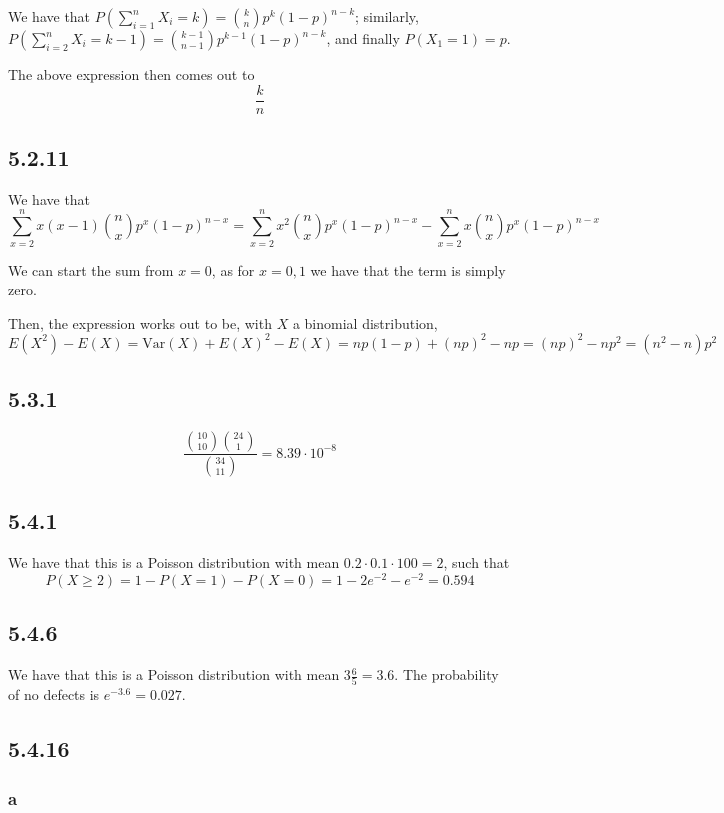\documentclass[12pt,letterpaper]{article}
\theoremstyle{definition}
\newcommand{\var}[1]{\text{Var}\left(#1\right)}
\begin{document}
We have that $P(\sum_{i=1}^nX_i = k) = \binom{k}{n}p^k(1-p)^{n-k}$; similarly, $P(\sum_{i=2}^nX_i = k-1) =
\binom{k-1}{n-1}p^{k-1}(1-p)^{n-k}$, and finally $P(X_1 = 1) = p$.

The above expression then comes out to
\[
  \frac{k}{n}
\]

\subsection*{5.2.11}

We have that
\[
  \sum_{x=2}^nx(x-1)\binom{n}{x}p^x(1-p)^{n-x}  =
  \sum_{x=2}^nx^2\binom{n}{x}p^x(1-p)^{n-x} - \sum_{x=2}^nx\binom{n}{x}p^x(1-p)^{n-x}
\]

We can start the sum from $x = 0$, as for $x = 0, 1$ we have that the term is
simply zero.

Then, the expression works out to be, with $X$ a binomial distribution,
\[
  E(X^2) - E(X) = \var{X} + E(X)^2 - E(X) = np(1-p) + (np)^2 - np = (np)^2 -
  np^2 = (n^2 - n)p^2
\]

\subsection*{5.3.1}

\[
  \frac{\binom{10}{10}\binom{24}{1}}{\binom{34}{11}} = 8.39 \cdot 10^{-8}
\]

\subsection*{5.4.1}

We have that this is a Poisson distribution with mean $0.2 \cdot 0.1 \cdot 100 =
2$, such that
\[
  P(X \geq 2) = 1 - P(X = 1) - P(X = 0) = 1 - 2e^{-2} - e^{-2} = 0.594
\]


\subsection*{5.4.6}

We have that this is a Poisson distribution with mean $3\frac{6}{5} = 3.6$. The
probability of no defects is $e^{-3.6} = 0.027$.

\subsection*{5.4.16}

\subsubsection*{a}
\end{document}
